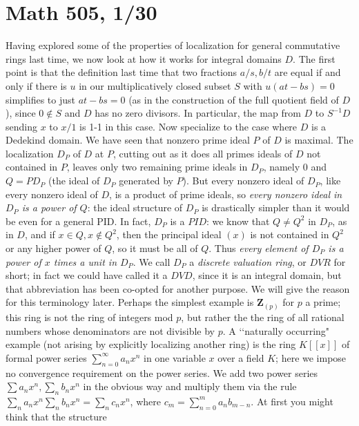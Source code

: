 \documentclass[10pt]{article}
\begin{document}
\section*{Math 505, 1/30}

Having explored some of the properties of localization for general
commutative rings last time, we now look at how it works for integral
domains $D$. The first point is that the definition last time that two
fractions $a/s,b/t$ are equal if and only if there is $u$ in our
multiplicatively closed subset $S$ with $u(at - bs) = 0$ simplifies to
just $at - bs = 0$ (as in the construction of the full quotient field of
$D$), since $0\notin S$ and $D$ has no zero divisors. In particular, the
map from $D$ to $S^{-1}D$ sending $x$ to $x/1$ is 1-1 in this case. Now
specialize to the case where $D$ is a Dedekind domain. We have seen that
nonzero prime ideal $P$ of $D$ is maximal. The localization $D_P$ of $D$
at $P$, cutting out as it does all primes ideals of $D$ not contained in
$P$, leaves only two remaining prime ideals in $D_P$, namely 0 and
$Q=PD_P$ (the ideal of $D_P$ generated by $P$). But every nonzero ideal
of $D_P$, like every nonzero ideal of $D$, is a product of prime ideals,
so {\sl every nonzero ideal in $D_P$ is a power of $Q$}: the ideal
structure of $D_P$ is drastically simpler than it would be even for a
general PID. In fact, $D_P$ is a $PID$: we know that $Q\ne Q^2$ in
$D_P$, as in $D$, and if $x\in Q,x\notin Q^2$, then the principal ideal
$(x)$ is not contained in $Q^2$ or any higher power of $Q$, so it must
be all of $Q$. Thus {\sl every element of $D_P$ is a power of $x$ times
  a unit in $D_P$}. We call $D_P$ a {\sl discrete valuation ring}, or
$DVR$ for short; in fact we could have called it a $DVD$, since it is an
integral domain, but that abbreviation has been co-opted for another
purpose. We will give the reason for this terminology later. Perhaps the
simplest example is $\mathbf Z_{(p)}$ for $p$ a prime; this ring is not
the ring of integers mod $p$, but rather the the ring of all rational
numbers whose denominators are not divisible by $p$. A \lq\lq naturally
occurring" example (not arising by explicitly localizing another ring)
is the ring $K[[x]]$ of formal power series $\sum_{n=0}^\infty a_n x^n$
in one variable $x$ over a field $K$; here we impose no convergence
requirement on the power series. We add two power series $\sum a_n x^n,
\sum_n b_n x^n$ in the obvious way and multiply them via the rule
$\sum_n a_n x^n \sum_n b_n x^n = \sum_n c_n x^n$, where $c_m =
\sum_{n=0}^m a_n b_{m-n}$. At first you might think that the structure
\end{document}
